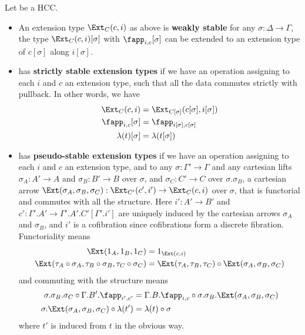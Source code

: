 \documentclass{amsart}
\begin{document}
\begin{defn}
  Let \E be a HCC.
  \begin{itemize}
  \item An extension type $\Ext_C(c,i)$ as above is \textbf{weakly stable} for any $\sigma:\Delta\to\Gamma$, the type $\Ext_C(c,i)[\sigma]$ with $\fapp_{i,c}[\sigma]$ can be extended to an extension type of $c[\sigma]$ along $i[\sigma]$.
  \item \E has \textbf{strictly stable extension types} if we have an operation assigning to each $i$ and $c$ an extension type, such that all the data commutes strictly with pullback.
    In other words, we have
    \begin{align*}
      \Ext_C(c,i) &= \Ext_{C[\sigma]}(c[\sigma],i[\sigma])\\
      \fapp_{i,c}[\sigma] &= \fapp_{i[\sigma],c[\sigma]}\\
      \lambda(t)[\sigma] &= \lambda(t[\sigma])
    \end{align*}
  \item \E has \textbf{pseudo-stable extension types} if we have an operation assigning to each $i$ and $c$ an extension type, and to any $\sigma:\Gamma'\to\Gamma$ and any cartesian lifts $\sigma_A : A' \to A$ and $\sigma_B : B'\to B$ over $\sigma$, and $\sigma_C : C' \to C$ over $\sigma.\sigma_B$, a cartesian arrow $\Ext(\sigma_A,\sigma_B,\sigma_C) : \Ext_{C'}(c',i') \to \Ext_C(c,i)$ over $\sigma$, that is functorial and commutes with all the structure.
    Here $i':A'\to B'$ and $c':\Gamma'.A' \to \Gamma'.A'.C'[\Gamma'.i']$ are uniquely induced by the cartesian arrows $\sigma_A$ and $\sigma_B$, and $i'$ is a cofibration since cofibrations form a discrete fibration.
    Functoriality means
    \begin{align*}
      \Ext(1_A,1_B,1_C) &= 1_{\Ext(c,i)}\\
      \Ext(\tau_A \circ \sigma_A,\tau_B \circ \sigma_B,\tau_C \circ \sigma_C) &= \Ext(\tau_A,\tau_B,\tau_C) \circ \Ext(\sigma_A,\sigma_B,\sigma_C)
    \end{align*}
    and commuting with the structure means
    \begin{align*}
      \sigma.\sigma_B.\sigma_C \circ \Gamma.B'.\fapp_{i',c'} &= \Gamma.B.\fapp_{i,c} \circ \sigma.\sigma_B.\Ext(\sigma_A,\sigma_B,\sigma_C)\\
      \sigma.\Ext(\sigma_A,\sigma_B,\sigma_C) \circ \lambda(t') &= \lambda(t) \circ \sigma
    \end{align*}
    where $t'$ is induced from $t$ in the obvious way.
  \end{itemize}
\end{defn}
\end{document}
